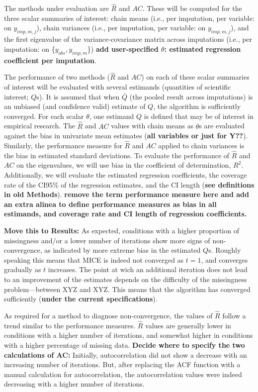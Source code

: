\documentclass[Royal,times,sageh]{sagej}
\begin{document}
The methods under evaluation are \(\widehat{R}\) and \(AC\). These will
be computed for the three scalar summaries of interest: chain means
(i.e., per imputation, per variable: on \(y_{imp, m, j}\)), chain
variances (i.e., per imputation, per variable: on \(y_{imp, m, j}\)),
and the first eigenvalue of the variance-covariance matrix across
imputations (i.e., per imputation: on \{\(y_{obs}, y_{imp, m}\)\})
\textbf{add user-specified \(\theta\): estimated regression coefficient
per imputation}.

The performance of two methods (\(\widehat{R}\) and \(AC\)) on each of
these scalar summaries of interest will be evaluated with several
estimands (quantities of scientific interest; \(Q\)s). It is assumed
that when \(\bar{Q}\) (the pooled result across imputations) is an
unbiased (and confidence valid) estimate of \(Q\), the algorithm is
sufficiently converged. For each scalar \(\theta\), one estimand \(Q\)
is defined that may be of interest in empirical research. The
\(\widehat{R}\) and \(AC\) values with chain means as \(\theta\)s are
evaluated against the bias in univariate mean estimates (\textbf{all
variables or just for Y??}). Similarly, the performance measure for
\(\widehat{R}\) and \(AC\) applied to chain variances is the bias in
estimated standard deviations. To evaluate the performance of
\(\widehat{R}\) and \(AC\) on the eigenvalues, we will use bias in the
coefficient of determination, \(R^2\). Additionally, we will evaluate
the estimated regression coefficients, the coverage rate of the CI95\%
of the regression estimates, and the CI length (\textbf{see definitions
in old Methods}). \textbf{remove the term performance measure here and
add an extra alinea to define performance measures as bias in all
estimands, and coverage rate and CI length of regression coefficients.}

\textbf{Move this to Results:} As expected, conditions with a higher
proportion of missingness and/or a lower number of iterations show more
signs of non-convergence, as indicated by more extreme bias in the
estimated \(Q\)s. Roughly speaking this means that MICE is indeed not
converged as \(t=1\), and converges gradually as \(t\) increases. The
point at wich an additional iteration does not lead to an improvement of
the estimates depends on the difficulty of the missingness
problem---between XYZ and XYZ. This means that the algorithm has
converged sufficiently (\textbf{under the current specifications}).

As required for a method to diagnose non-convergence, the values of
\(\widehat{R}\) follow a trend similar to the performance measures.
\(\widehat{R}\) values are generally lower in conditions with a higher
number of iterations, and somewhat higher in conditions with a higher
percentage of missing data. \textbf{Decide where to specify the two
calculations of AC:} Initially, autocorrelation did not show a decrease
with an increasing number of iterations. But, after replacing the ACF
function with a manual calculation for autocorrelation, the
autocorrelation values were indeed decreasing with a higher number of
iterations.
\end{document}
